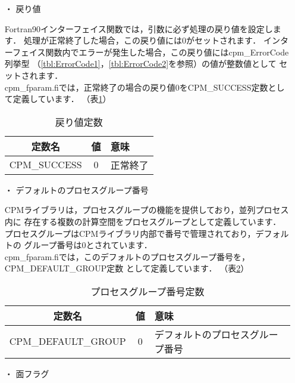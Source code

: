 \begin{itemize}
\item[・] {戻り値}

Fortran90インターフェイス関数では，引数に必ず処理の戻り値を設定します．
処理が正常終了した場合，この戻り値には0がセットされます．
インターフェイス関数内でエラーが発生した場合，この戻り値にはcpm\_ErrorCode列挙型
（\ref{tbl:ErrorCode1}，\ref{tbl:ErrorCode2}を参照）の値が整数値として
セットされます．\\
cpm\_fparam.fiでは，正常終了の場合の戻り値0をCPM\_SUCCESS定数として定義しています．
（表\ref{tbl:retval}）\\

\begin{table}[htb]
\begin{center}
\caption{戻り値定数}
\label{tbl:retval}
\begin{tabular}{|c|c|l|}
\hline 
定数名 & 値 & 意味\\
\hline
CPM\_SUCCESS & 0 & 正常終了 \\
\hline   
\end{tabular}
\end{center}
\end{table}


\item[・] {デフォルトのプロセスグループ番号}

CPMライブラリは，プロセスグループの機能を提供しており，並列プロセス内に
存在する複数の計算空間をプロセスグループとして定義しています．
プロセスグループはCPMライブラリ内部で番号で管理されており，デフォルトの
グループ番号は0とされています．\\
cpm\_fparam.fiでは，このデフォルトのプロセスグループ番号を，CPM\_DEFAULT\_GROUP定数
として定義しています．
（表\ref{tbl:defGrp}）\\

\begin{table}[htb]
\begin{center}
\caption{プロセスグループ番号定数}
\label{tbl:defGrp}
\begin{tabular}{|c|c|l|}
\hline 
定数名 & 値 & 意味\\
\hline
CPM\_DEFAULT\_GROUP & 0 & デフォルトのプロセスグループ番号 \\
\hline   
\end{tabular}
\end{center}
\end{table}


\item[・] {面フラグ}


\end{itemize}
